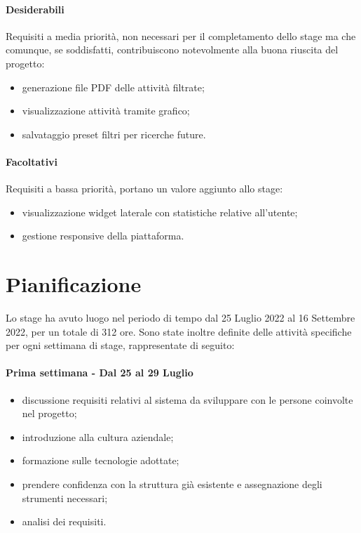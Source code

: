\paragraph{Desiderabili} Requisiti a media priorità, non necessari per il completamento dello stage ma che comunque, se soddisfatti, contribuiscono notevolmente alla buona riuscita del progetto: 

\begin{itemize}
  \item generazione file PDF delle attività filtrate;
  \item visualizzazione attività tramite grafico;
  \item salvataggio preset filtri per ricerche future.
\end{itemize} 

\paragraph{Facoltativi} Requisiti a bassa priorità, portano un valore aggiunto allo stage:

\begin{itemize}
  \item visualizzazione widget laterale con statistiche relative all'utente;
  \item gestione responsive della piattaforma.
\end{itemize}

\section{Pianificazione}

Lo stage ha avuto luogo nel periodo di tempo dal 25 Luglio 2022 al 16 Settembre 2022, per un totale di 312 ore.
Sono state inoltre definite delle attività specifiche per ogni settimana di stage, rappresentate di seguito:

\paragraph{Prima settimana - Dal 25 al 29 Luglio}

\begin{itemize}
  \item discussione requisiti relativi al sistema da sviluppare con le persone coinvolte nel progetto;
  \item introduzione alla cultura aziendale;
  \item formazione sulle tecnologie adottate;
  \item prendere confidenza con la struttura già esistente e assegnazione degli strumenti necessari;
  \item analisi dei requisiti.
\end{itemize}

